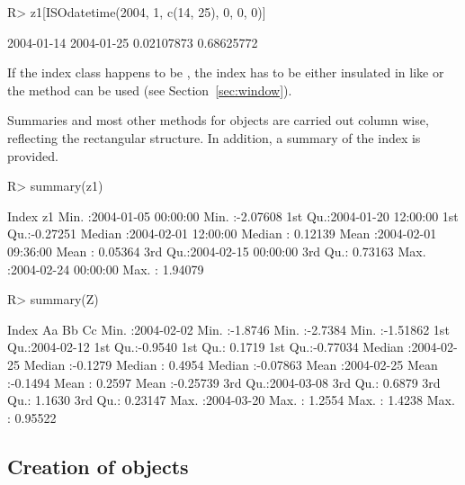 \documentclass{Z}
\begin{document}
\begin{Schunk}
\begin{Sinput}
R> z1[ISOdatetime(2004, 1, c(14, 25), 0, 0, 0)]
\end{Sinput}
\begin{Soutput}
2004-01-14 2004-01-25 
0.02107873 0.68625772 
\end{Soutput}
\end{Schunk}

If the index class happens to be , the index has to be either insulated in 
like  or the   method can be used (see Section~\ref{sec:window}).

Summaries and most other methods for  objects are carried out
column wise, reflecting the rectangular structure. In addition,
a summary of the index is provided.

\begin{Schunk}
\begin{Sinput}
R> summary(z1)
\end{Sinput}
\begin{Soutput}
     Index                           z1          
 Min.   :2004-01-05 00:00:00   Min.   :-2.07608  
 1st Qu.:2004-01-20 12:00:00   1st Qu.:-0.27251  
 Median :2004-02-01 12:00:00   Median : 0.12139  
 Mean   :2004-02-01 09:36:00   Mean   : 0.05364  
 3rd Qu.:2004-02-15 00:00:00   3rd Qu.: 0.73163  
 Max.   :2004-02-24 00:00:00   Max.   : 1.94079  
\end{Soutput}
\begin{Sinput}
R> summary(Z)
\end{Sinput}
\begin{Soutput}
     Index                  Aa                Bb                Cc          
 Min.   :2004-02-02   Min.   :-1.8746   Min.   :-2.7384   Min.   :-1.51862  
 1st Qu.:2004-02-12   1st Qu.:-0.9540   1st Qu.: 0.1719   1st Qu.:-0.77034  
 Median :2004-02-25   Median :-0.1279   Median : 0.4954   Median :-0.07863  
 Mean   :2004-02-25   Mean   :-0.1494   Mean   : 0.2597   Mean   :-0.25739  
 3rd Qu.:2004-03-08   3rd Qu.: 0.6879   3rd Qu.: 1.1630   3rd Qu.: 0.23147  
 Max.   :2004-03-20   Max.   : 1.2554   Max.   : 1.4238   Max.   : 0.95522  
\end{Soutput}
\end{Schunk}


\subsection[Creation of "zooreg" objects]{Creation of  objects}
\label{sec:zooreg}
\end{document}
